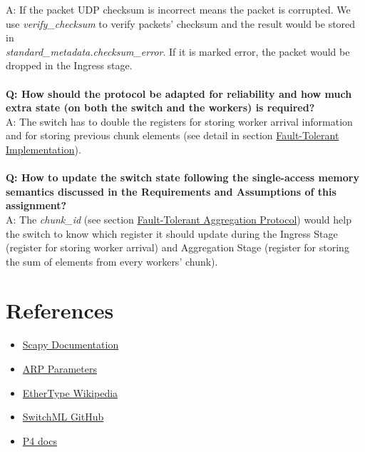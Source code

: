 \documentclass[a4paper,11pt]{article}
\begin{document}
\begin{itemize}
    A: If the packet UDP checksum is incorrect means the packet is corrupted. We use \textit{verify\_checksum} to verify packets' checksum and the result would be stored in \\
    \textit{standard\_metadata.checksum\_error}. If it is marked error, the packet would be dropped in the Ingress stage.
    \\\\
    \textbf{Q: How should the protocol be adapted for reliability and how much extra state (on both the switch and the workers) is required? \\}
    A: The switch has to double the registers for storing worker arrival information and for storing previous chunk elements (see detail in section \hyperref[sec:fti]{Fault-Tolerant Implementation}).
    \\\\
    \textbf{Q: How to update the switch state following the single-access memory semantics discussed in the Requirements and Assumptions of this assignment? \\}
    A: The \textit{chunk\_id} (see section \hyperref[ftap]{Fault-Tolerant Aggregation Protocol}) would help the switch to know which register it should update during the Ingress Stage (register for storing worker arrival) and Aggregation Stage (register for storing the sum of elements from every workers' chunk).
    \\
\end{itemize}


\section{References}
\begin{itemize}
    \item \href{https://buildmedia.readthedocs.org/media/pdf/scapy/latest/scapy.pdf}{Scapy Documentation}
    \item
    \href{https://www.iana.org/assignments/arp-parameters/arp-parameters.xhtml#arp-parameters-3}{ARP Parameters}
    \item
    \href{https://en.wikipedia.org/wiki/EtherType}{EtherType Wikipedia}
    \item \href{https://github.com/p4lang/p4app-switchML}{SwitchML GitHub}
    \item \href{https://p4.org/p4-spec/docs/P4-16-v1.0.0-spec.html#sec-expr-hs}{P4 docs}
\end{itemize}
\end{document}
